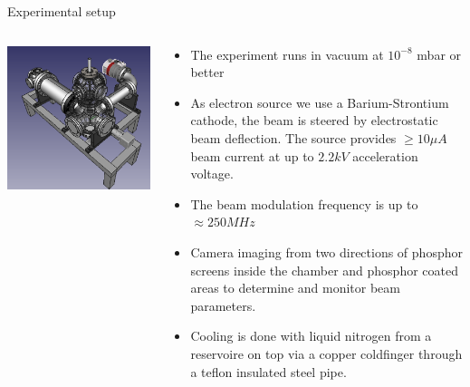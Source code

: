 \documentclass[final]{beamer}
\begin{document}
\begin{frame}[fragile]{}
\begin{columns}[T]
    \begin{column}{.49\linewidth}
      \begin{block}{\large Experimental setup}
        \begin{columns}
          \begin{column}{0.4\columnwidth}
            \includegraphics[width=\columnwidth]{figures/cryoquak02.png}
          \end{column}
          \begin{column}{0.6\columnwidth}
              \begin{itemize}
                \item The experiment runs in vacuum at $10^{-8}$ mbar or better
                \item As electron source we use a Barium-Strontium cathode, the beam is steered
                    by electrostatic beam deflection. The source provides $\geq 10 \mu A$ beam
                    current at up to $2.2 kV$ acceleration voltage.
                \item The beam modulation frequency is up to $\approx 250 MHz$
                \item Camera imaging from two directions of phosphor screens inside the
                    chamber and phosphor coated areas to determine and monitor beam
                    parameters.
                \item Cooling is done with liquid nitrogen from a reservoire on top
                    via a copper coldfinger through a teflon insulated steel pipe.
              \end{itemize}
          \end{column}
        \end{columns}
      \end{block}


\end{column}
\end{columns}
\end{frame}
\end{document}
